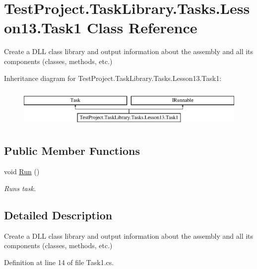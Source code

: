 \hypertarget{class_test_project_1_1_task_library_1_1_tasks_1_1_lesson13_1_1_task1}{}\section{Test\+Project.\+Task\+Library.\+Tasks.\+Lesson13.\+Task1 Class Reference}
\label{class_test_project_1_1_task_library_1_1_tasks_1_1_lesson13_1_1_task1}


Create a D\+LL class library and output information about the assembly and all its components (classes, methods, etc.)  


Inheritance diagram for Test\+Project.\+Task\+Library.\+Tasks.\+Lesson13.\+Task1\+:\begin{figure}[H]
\begin{center}
\leavevmode
\includegraphics[height=1.964912cm]{class_test_project_1_1_task_library_1_1_tasks_1_1_lesson13_1_1_task1}
\end{center}
\end{figure}
\subsection*{Public Member Functions}
\begin{DoxyCompactItemize}
\item 
void \mbox{\hyperlink{class_test_project_1_1_task_library_1_1_tasks_1_1_lesson13_1_1_task1_a9b742ee600c6244e0aebc1896b4f88a5}{Run}} ()
\begin{DoxyCompactList}\small\item\em Runs task. \end{DoxyCompactList}\end{DoxyCompactItemize}


\subsection{Detailed Description}
Create a D\+LL class library and output information about the assembly and all its components (classes, methods, etc.) 



Definition at line 14 of file Task1.\+cs.



